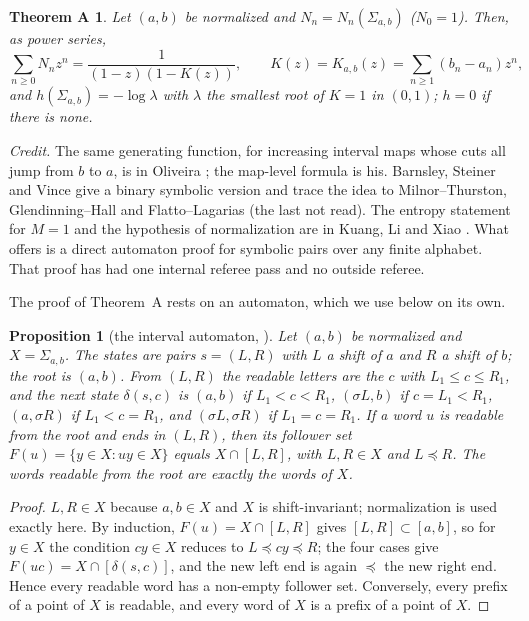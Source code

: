 \documentclass[11pt]{amsart}
\newtheorem{proposition}[theorem]{Proposition}
\newtheorem*{thmA}{Theorem A}
\theoremstyle{definition}
\theoremstyle{remark}
\newcommand{\lex}{\preccurlyeq}
\begin{document}
\begin{thmA}
Let $(a,b)$ be normalized and $N_n=N_n(\Sigma_{a,b})$ ($N_0=1$). Then, as power series,
\[
\sum_{n\ge0}N_nz^n=\frac{1}{(1-z)(1-K(z))},\qquad K(z)=K_{a,b}(z)=\sum_{n\ge1}(b_n-a_n)z^n,
\]
and $h(\Sigma_{a,b})=-\log\lambda$ with $\lambda$ the smallest root of $K=1$ in $(0,1)$; $h=0$ if there is none.
\end{thmA}

\emph{Credit.} The same generating function, for increasing interval maps whose cuts all jump from $b$ to $a$, is in Oliveira \cite[Section~10, eq.~(28), and Theorem~4.2]{Oliveira}; the map-level formula is his. Barnsley, Steiner and Vince \cite[Lemma~3]{BSV} give a binary symbolic version and trace the idea to Milnor--Thurston, Glendinning--Hall and Flatto--Lagarias (the last not read). The entropy statement for $M=1$ and the hypothesis of normalization are in Kuang, Li and Xiao \cite[Theorem~4.3]{KLX}. What \cite{Nem26} offers is a direct automaton proof for symbolic pairs over any finite alphabet. That proof has had one internal referee pass and no outside referee.

The proof of Theorem~A rests on an automaton, which we use below on its own.

\begin{proposition}[{the interval automaton, \cite[proof of Theorem~7.1]{Nem26}}]\label{prop:auto}
Let $(a,b)$ be normalized and $X=\Sigma_{a,b}$. The states are pairs $s=(L,R)$ with $L$ a shift of $a$ and $R$ a shift of $b$; the root is $(a,b)$. From $(L,R)$ the readable letters are the $c$ with $L_1\le c\le R_1$, and the next state $\delta(s,c)$ is $(a,b)$ if $L_1<c<R_1$, $(\sigma L,b)$ if $c=L_1<R_1$, $(a,\sigma R)$ if $L_1<c=R_1$, and $(\sigma L,\sigma R)$ if $L_1=c=R_1$. If a word $u$ is readable from the root and ends in $(L,R)$, then its follower set $F(u)=\{y\in X:uy\in X\}$ equals $X\cap[L,R]$, with $L,R\in X$ and $L\lex R$. The words readable from the root are exactly the words of $X$.
\end{proposition}

\begin{proof}
$L,R\in X$ because $a,b\in X$ and $X$ is shift-invariant; normalization is used exactly here. By induction, $F(u)=X\cap[L,R]$ gives $[L,R]\subset[a,b]$, so for $y\in X$ the condition $cy\in X$ reduces to $L\lex cy\lex R$; the four cases give $F(uc)=X\cap[\delta(s,c)]$, and the new left end is again $\lex$ the new right end. Hence every readable word has a non-empty follower set. Conversely, every prefix of a point of $X$ is readable, and every word of $X$ is a prefix of a point of $X$.
\end{proof}
\end{document}
